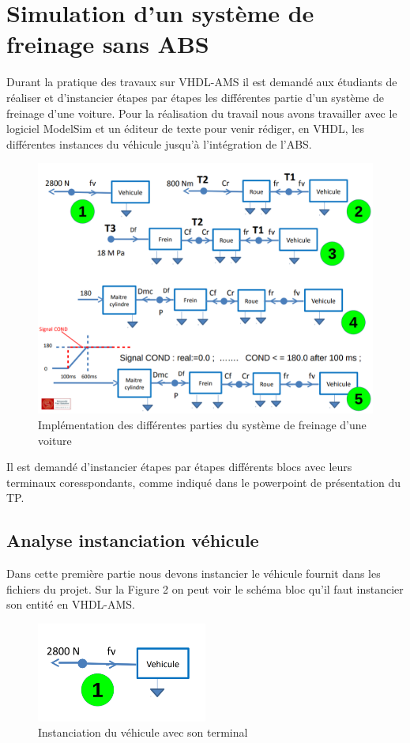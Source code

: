 \section{Simulation d'un système de freinage sans ABS}
Durant la pratique des travaux sur VHDL-AMS il est demandé aux étudiants de réaliser et d'instancier étapes par étapes les différentes partie d'un système de freinage d'une voiture. Pour la réalisation du travail nous avons travailler avec le logiciel ModelSim et un éditeur de texte pour venir rédiger, en VHDL, les différentes instances du véhicule jusqu'à l'intégration de l'ABS.

\begin{figure}[h]
    \centering
    \includegraphics[width=\textwidth]{images/etapes.png}
    \caption{Implémentation des différentes parties du système de freinage d'une voiture}
\end{figure}

Il est demandé d'instancier étapes par étapes différents blocs avec leurs terminaux coresspondants, comme indiqué dans le powerpoint de présentation du TP.

\newpage

\subsection{Analyse instanciation véhicule }
Dans cette première partie nous devons instancier le véhicule fournit dans les fichiers du projet. Sur la Figure 2 on peut voir le schéma bloc qu'il faut instancier son entité en VHDL-AMS.

\begin{figure}[h]
    \centering
    \includegraphics[width=0.5\textwidth]{images/un.png}
    \caption{Instanciation du véhicule avec son terminal}
\end{figure}

